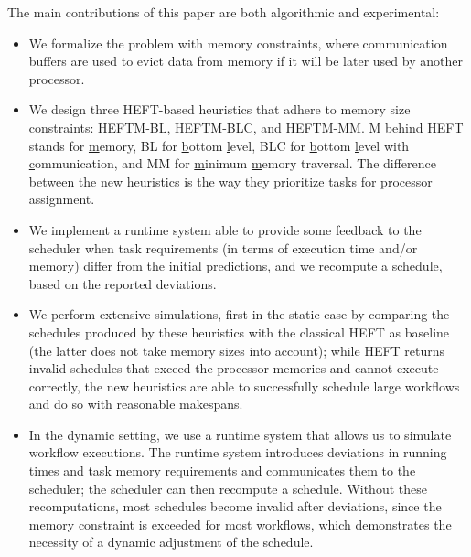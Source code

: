\documentclass[conference]{IEEEtran}
\newcommand{\algo}[1]{\textsc{#1}}
\newcommand{\heftmm}{\algo{HEFTM-MM}\xspace}
\newcommand{\heftbl}{\algo{HEFTM-BL}\xspace}
\newcommand{\heftblc}{\algo{HEFTM-BLC}\xspace}
\newcommand{\hmey}[1]{{\color{red}[HM: #1]}}
\begin{document}
The main contributions of this paper are both algorithmic and experimental:
\begin{itemize}
\item We formalize the problem with memory constraints, where communication buffers
are used to evict data from memory if it will be later used by another processor. 
\item We design three HEFT-based heuristics
that adhere to memory size constraints: \heftbl, \heftblc, and \heftmm.
M behind HEFT stands for \underline{m}emory, BL for \underline{b}ottom \underline{l}evel,
BLC for \underline{b}ottom \underline{l}evel with \underline{c}ommunication, 
and MM for \underline{m}inimum \underline{m}emory traversal.
The difference between the new heuristics is the way they prioritize tasks for processor assignment.

\item We implement a runtime system able to provide some feedback to the scheduler
when task requirements (in terms of execution time and/or memory) differ from the initial predictions, 
and we recompute a schedule, based on the reported deviations. 

\item We perform extensive simulations, first in the static case by comparing the schedules produced 
by these heuristics with the classical HEFT as baseline (the latter does not take memory sizes into account); 
while HEFT returns invalid schedules that exceed the processor memories and cannot execute correctly,
the new heuristics are able to successfully schedule large workflows and do so with reasonable makespans.

\item In the dynamic setting, we use a runtime system that allows us to simulate workflow executions.
The runtime system introduces deviations in running times and task memory requirements and communicates
them to the scheduler; the scheduler can then recompute a schedule. Without these recomputations,
most schedules become invalid after deviations, since the memory constraint is exceeded 
for most workflows, which demonstrates the necessity of a dynamic adjustment of the schedule. 


\end{itemize}
\end{document}
